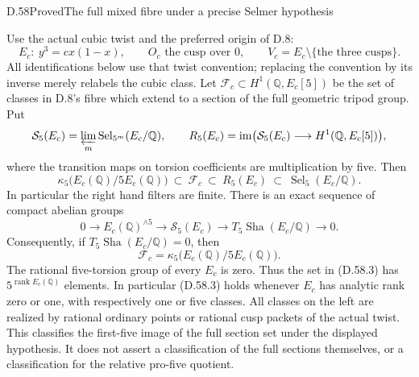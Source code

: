 \begin{statement}{D.58}{Proved}{The full mixed fibre under a precise Selmer hypothesis}

Use the actual cubic twist and the preferred origin of D.8:
\[
 E_c:\ y^3=cx(1-x),\qquad O_c\text{ the cusp over }0,
 \qquad V_c=E_c\setminus\{\text{the three cusps}\}.
\]
All identifications below use that twist convention; replacing the
convention by its inverse merely relabels the cubic class.  Let
$\mathcal F_c\subset H^1(\mathbb Q,E_c[5])$ be the set of
classes in D.8's fibre which extend to a section of the full
geometric tripod group.  Put
\[
 \mathcal S_5(E_c)=\varprojlim_m\operatorname{Sel}_{5^m}(E_c/\mathbb Q),
 \qquad
 R_5(E_c)=\operatorname{im}\bigl(\mathcal S_5(E_c)
                  \longrightarrow H^1(\mathbb Q,E_c[5])\bigr),
\]
where the transition maps on torsion coefficients are multiplication
by five.  Then
\[
 \kappa_5\bigl(E_c(\mathbb Q)/5E_c(\mathbb Q)\bigr)
       \ \subset\ \mathcal F_c\ \subset\ R_5(E_c)
       \ \subset\ \operatorname{Sel}_5(E_c/\mathbb Q).       \tag{D.58.1}
\]
In particular the right hand filters are finite.  There is an exact
sequence of compact abelian groups
\[
 0\longrightarrow E_c(\mathbb Q)^{\wedge 5}
 \longrightarrow\mathcal S_5(E_c)
 \longrightarrow T_5\operatorname{Sha}(E_c/\mathbb Q)\longrightarrow0.  \tag{D.58.2}
\]
Consequently, if $T_5\operatorname{Sha}(E_c/\mathbb Q)=0$, then
\[
 \mathcal F_c=
 \kappa_5\bigl(E_c(\mathbb Q)/5E_c(\mathbb Q)\bigr).       \tag{D.58.3}
\]
The rational five-torsion group of every $E_c$ is zero.  Thus the
set in (D.58.3) has $5^{\operatorname{rank}E_c(\mathbb Q)}$
elements.  In particular (D.58.3) holds whenever $E_c$ has
analytic rank zero or one, with respectively one or five classes.
All classes on the left are realized by rational ordinary points
or rational cusp packets of the actual twist.  This classifies
the first-five image of the full section set under the displayed
hypothesis.  It does not assert a classification of the full
sections themselves, or a classification for the relative
pro-five quotient.

\end{statement}
